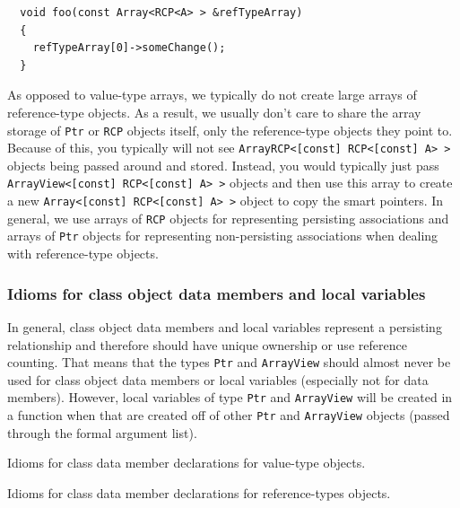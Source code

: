 \documentclass[pdf,ps2pdf,11pt]{SANDreport}
\begin{document}
{\small\begin{verbatim}
  void foo(const Array<RCP<A> > &refTypeArray)
  {
    refTypeArray[0]->someChange();
  }
\end{verbatim}}

As opposed to value-type arrays, we typically do not create large
arrays of reference-type objects.  As a result, we usually don't care
to share the array storage of {}\texttt{Ptr} or {}\texttt{RCP} objects
itself, only the reference-type objects they point to.  Because of
this, you typically will not see {}\texttt{ArrayRCP<[const]
RCP<[const] A> >} objects being passed around and stored.  Instead,
you would typically just pass {}\texttt{ArrayView<[const] RCP<[const]
A> >} objects and then use this array to create a new
{}\texttt{Array<[const] RCP<[const] A> >} object to copy the smart
pointers.  In general, we use arrays of {}\texttt{RCP} objects for
representing persisting associations and arrays of {}\texttt{Ptr}
objects for representing non-persisting associations when dealing with
reference-type objects.


%
{}\subsubsection{Idioms for class object data members and local
variables}
%

In general, class object data members and local variables represent a
persisting relationship and therefore should have unique ownership or
use reference counting.  That means that the types {}\texttt{Ptr} and
{}\texttt{ArrayView} should almost never be used for class object data
members or local variables (especially not for data members).
However, local variables of type {}\texttt{Ptr} and
{}\texttt{ArrayView} will be created in a function when that are
created off of other {}\texttt{Ptr} and {}\texttt{ArrayView} objects
(passed through the formal argument list).

\begin{table}
%
\begin{center}
%
%

%
%
\end{center}
\caption{\label{fig:data_member_value_type}
Idioms for class data member declarations for value-type objects.}
%
\end{table}

\begin{table}
%
\begin{center}
%
%

%
%
\end{center}
\caption{\label{fig:data_member_reference_type}
Idioms for class data member declarations for reference-types
objects.}
%
\end{table}
\end{document}
